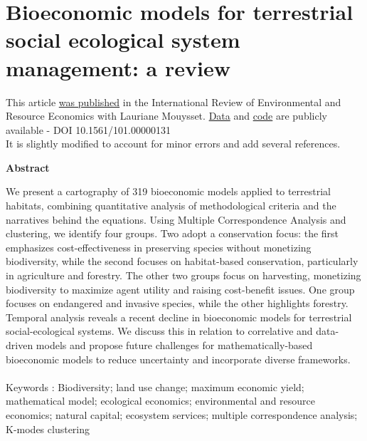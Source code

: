 \chapter{Bioeconomic models for terrestrial social ecological system management: a review}
\label{chapter1}

\begin{center}
\begin{minipage}{0.9\textwidth}
\singlespacing
This article \href{https://sim-jean.github.io/files/research/jean_mouysset2022.pdf}{was published} in the International Review of Environmental and Resource Economics with Lauriane Mouysset. \href{https://zenodo.org/records/6656433}{Data} and \href{https://github.com/sim-jean/review-irere/tree/main}{code} are publicly available - DOI 10.1561/101.00000131\\
It is slightly modified to account for minor errors and add several references.
\end{minipage}

\vspace*{.5cm}

\textbf{Abstract}\par
    \vspace*{.2cm}
    \noindent

\begin{minipage}{0.9\textwidth}
\singlespacing
We present a cartography of 319 bioeconomic models applied to terrestrial habitats, combining quantitative analysis of methodological criteria and the narratives behind the equations. Using Multiple Correspondence Analysis and clustering, we identify four groups. Two adopt a conservation focus: the first emphasizes cost-effectiveness in preserving species without monetizing biodiversity, while the second focuses on habitat-based conservation, particularly in agriculture and forestry. The other two groups focus on harvesting, monetizing biodiversity to maximize agent utility and raising cost-benefit issues. One group focuses on endangered and invasive species, while the other highlights forestry. Temporal analysis reveals a recent decline in bioeconomic models for terrestrial social-ecological systems. We discuss this in relation to correlative and data-driven models and propose future challenges for mathematically-based bioeconomic models to reduce uncertainty and incorporate diverse frameworks.
\\\\
Keywords : Biodiversity; land use change; maximum economic yield; mathematical model; ecological economics; environmental and resource economics; natural capital; ecosystem services; multiple correspondence analysis; K-modes clustering
\end{minipage}
\end{center}
    \vfill
\newpage

